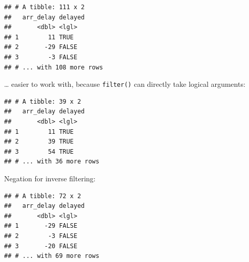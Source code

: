 \documentclass[]{book}
\newenvironment{Shaded}{}{}
\newcommand{\DataTypeTok}[1]{#1}
\newcommand{\DecValTok}[1]{#1}
\newcommand{\KeywordTok}[1]{\textcolor[rgb]{0.00,0.00,1.00}{#1}}
\newcommand{\NormalTok}[1]{#1}
\newcommand{\OperatorTok}[1]{#1}
\newcommand{\StringTok}[1]{\textcolor[rgb]{0.00,0.50,0.50}{#1}}
\begin{document}
\begin{verbatim}
## # A tibble: 111 x 2
##   arr_delay delayed
##       <dbl> <lgl>  
## 1        11 TRUE   
## 2       -29 FALSE  
## 3        -3 FALSE  
## # ... with 108 more rows
\end{verbatim}

\ldots{} easier to work with, because \texttt{filter()} can directly take logical arguments:

\begin{Shaded}
\end{Shaded}

\begin{verbatim}
## # A tibble: 39 x 2
##   arr_delay delayed
##       <dbl> <lgl>  
## 1        11 TRUE   
## 2        39 TRUE   
## 3        54 TRUE   
## # ... with 36 more rows
\end{verbatim}

Negation for inverse filtering:

\begin{Shaded}
\end{Shaded}

\begin{verbatim}
## # A tibble: 72 x 2
##   arr_delay delayed
##       <dbl> <lgl>  
## 1       -29 FALSE  
## 2        -3 FALSE  
## 3       -20 FALSE  
## # ... with 69 more rows
\end{verbatim}
\end{document}
